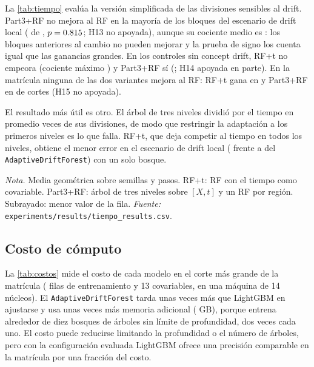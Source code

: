 \documentclass[11pt,a4paper]{article}
\newcommand{\nota}[1]{\par\smallskip\raggedright\footnotesize\textit{Nota.} #1}
\begin{document}
La \cref{tab:tiempo} evalúa la versión simplificada de las divisiones sensibles al drift. Part3+RF no
mejora al RF en la mayoría de los bloques del escenario de drift local (\VtiempoHnueve{} de
\VtiempoHnueveN, $p=0.815$; H13 no apoyada), aunque su cociente medio es \VtiempoLocalPart: los
bloques anteriores al cambio no pueden mejorar y la prueba de signo los cuenta igual que las ganancias
grandes. En los controles sin concept drift, RF+t no empeora (cociente máximo \VtiempoCtrlMaxRFt) y
Part3+RF sí (\VtiempoCtrlMaxPart; H14 apoyada en parte). En la matrícula ninguna de las dos variantes
mejora al RF: RF+t gana en \VmatRFtVsRF{} y Part3+RF en \VmatPartVsRF{} de \VmatN{} cortes (H15 no
apoyada).

El resultado más útil es otro. El árbol de tres niveles dividió por el tiempo en promedio
\VtiempoCortesT{} veces de sus \VtiempoCortes{} divisiones, de modo que restringir la adaptación a los
primeros niveles es lo que falla. RF+t, que deja competir al tiempo en todos los niveles, obtiene el
menor error en el escenario de drift local (\VtiempoLocalRFt{} frente a \VtiempoLocalAdf{} del
\texttt{AdaptiveDriftForest}) con un solo bosque.

\begin{table}[htbp]
  \centering
  \caption{Divisiones sensibles al tiempo: cociente de RMSE respecto al RF convencional (walk-forward)}\label{tab:tiempo}
  \small
  
  \nota{Media geométrica sobre semillas y pasos. RF+t: RF con el tiempo como covariable. Part3+RF:
  árbol de tres niveles sobre $[X,t]$ y un RF por región. Subrayado: menor valor de la fila.
  \textit{Fuente:} \texttt{experiments/results/tiempo\_results.csv}.}
\end{table}

\subsection{Costo de cómputo}\label{sec:res-costos}

La \cref{tab:costos} mide el costo de cada modelo en el corte más grande de la matrícula (\VcostoFilas{}
filas de entrenamiento y 13 covariables, en una máquina de 14 núcleos). El \texttt{AdaptiveDriftForest}
tarda unas \VcostoAdfVsLgbmFit{} veces más que LightGBM en ajustarse y usa unas \VcostoAdfVsLgbmRam{}
veces más memoria adicional (\VcostoAdfRam{} GB), porque entrena alrededor de diez bosques de árboles sin
límite de profundidad, dos veces cada uno. El costo puede reducirse limitando la profundidad o el número
de árboles, pero con la configuración evaluada LightGBM ofrece una precisión comparable en la matrícula
por una fracción del costo.
\end{document}
